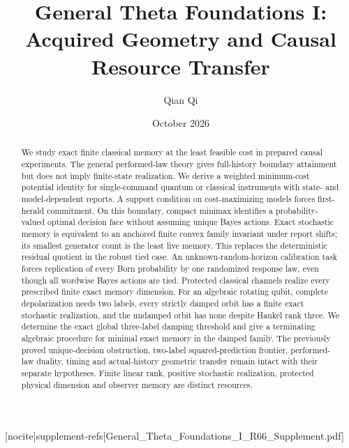 
[nocite]{supplement-refs}[General_Theta_Foundations_I_R66_Supplement.pdf]
\title[Acquired geometry and causal resource transfer]{General Theta Foundations I:\\Acquired Geometry and Causal Resource Transfer}
\author{Qian Qi}\date{October 2026}

\begin{abstract}
We study exact finite classical memory at the least feasible cost in prepared causal experiments. The general performed-law theory gives full-history boundary attainment but does not imply finite-state realization. We derive a weighted minimum-cost potential identity for single-command quantum or classical instruments with state- and model-dependent reports. A support condition on cost-maximizing models forces first-herald commitment. On this boundary, compact minimax identifies a probability-valued optimal decision face without assuming unique Bayes actions. Exact stochastic memory is equivalent to an anchored finite convex family invariant under report shifts; its smallest generator count is the least live memory. This replaces the deterministic residual quotient in the robust tied case. An unknown-random-horizon calibration task forces replication of every Born probability by one randomized response law, even though all wordwise Bayes actions are tied. Protected classical channels realize every prescribed finite exact memory dimension. For an algebraic rotating qubit, complete depolarization needs two labels, every strictly damped orbit has a finite exact stochastic realization, and the undamped orbit has none despite Hankel rank three. We determine the exact global three-label damping threshold and give a terminating algebraic procedure for minimal exact memory in the damped family. The previously proved unique-decision obstruction, two-label squared-prediction frontier, performed-law duality, timing and actual-history geometric transfer remain intact with their separate hypotheses. Finite linear rank, positive stochastic realization, protected physical dimension and observer memory are distinct resources.
\end{abstract}
\maketitle









